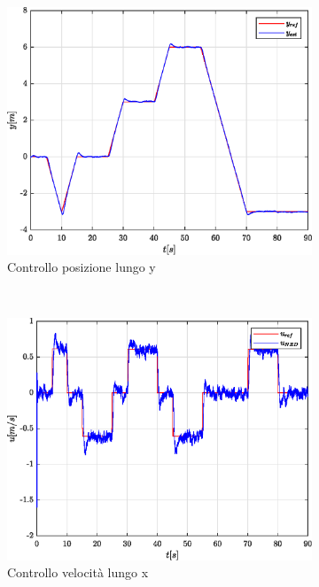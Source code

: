 \begin{figure}
\begin{subfigure}{0.45\textwidth}
		\includegraphics[width=1\textwidth]{Simulazioni/Figure/PID/SNAKE_MIL/PositionControlYPos}
		\caption{Controllo posizione lungo y}
	\end{subfigure}
	\\
	\begin{subfigure}{0.45\textwidth}
		\centering
		\includegraphics[width=1\textwidth]{Simulazioni/Figure/PID/SNAKE_MIL/PositionControlXVel}
		\caption{Controllo velocità lungo x}
	\end{subfigure}
	\hfill
	\begin{subfigure}{0.45\textwidth}
		\centering

\end{subfigure}
\end{figure}
